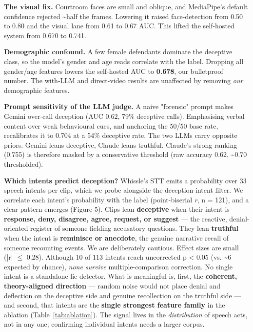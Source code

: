 \documentclass[11pt]{article}
\begin{document}
\textbf{The visual fix.} Courtroom faces are small and oblique, and MediaPipe's default confidence rejected \textasciitilde{}half the frames. Lowering it raised face-detection from 0.50 to 0.80 and the visual lane from 0.61 to 0.67 AUC. This lifted the self-hosted system from 0.670 to 0.741.

\textbf{Demographic confound.} A few female defendants dominate the deceptive class, so the model's gender and age reads correlate with the label. Dropping all gender/age features lowers the self-hosted AUC to \textbf{0.678}, our bulletproof number. The with-LLM and direct-video results are unaffected by removing \emph{our} demographic features.

\textbf{Prompt sensitivity of the LLM judge.} A naive "forensic" prompt makes Gemini over-call deception (AUC 0.62, 79\% deceptive calls). Emphasising verbal content over weak behavioural cues, and anchoring the 50/50 base rate, recalibrates it to 0.704 at a 54\% deceptive rate. The two LLMs carry opposite priors. Gemini leans deceptive, Claude leans truthful. Claude's strong ranking (0.755) is therefore masked by a conservative threshold (raw accuracy 0.62, \textasciitilde{}0.70 thresholded).

\textbf{Which intents predict deception?} Whissle's STT emits a probability over 33 speech intents per clip, which we probe alongside the deception-intent filter. We correlate each intent's probability with the label (point-biserial \emph{r}, n = 121), and a clear pattern emerges (Figure 5). Clips lean \textbf{deceptive} when their intent is \textbf{response, deny, disagree, agree, request, or suggest} --- the reactive, denial-oriented register of someone fielding accusatory questions. They lean \textbf{truthful} when the intent is \textbf{reminisce or anecdote}, the genuine narrative recall of someone recounting events. We are deliberately cautious. Effect sizes are small (|r| $\le$ 0.28). Although 10 of 113 intents reach uncorrected p < 0.05 (vs. \textasciitilde{}6 expected by chance), \emph{none survive} multiple-comparison correction. No single intent is a standalone lie detector. What is meaningful is, first, the \textbf{coherent, theory-aligned direction} --- random noise would not place denial and deflection on the deceptive side and genuine recollection on the truthful side --- and second, that intents are the \textbf{single strongest feature family} in the ablation (Table~\ref{tab:ablation}). The signal lives in the \emph{distribution} of speech acts, not in any one; confirming individual intents needs a larger corpus.
\end{document}
